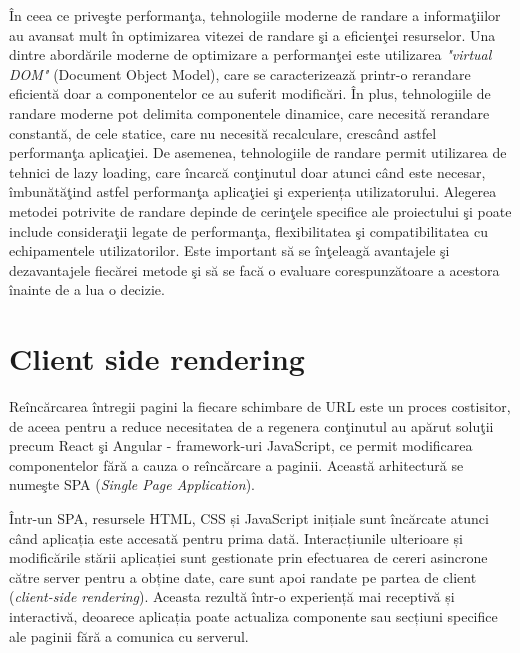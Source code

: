 \documentclass[12pt, a4paper]{report}
\begin{document}
\^ In ceea ce prive\c ste performan\c ta, tehnologiile moderne de randare a informa\c tiilor au avansat mult \^ in optimizarea vitezei de randare \c si a eficien\c tei resurselor. Una dintre abord\u arile moderne de optimizare a performan\c tei este utilizarea \emph{"virtual DOM"} (Document Object Model), care se caracterizează printr-o rerandare eficientă doar a componentelor ce au suferit modificări.
\^ In plus, tehnologiile de randare moderne pot delimita componentele dinamice, care necesită rerandare constantă, de cele statice, care nu necesit\u a recalculare, cresc\^ and astfel performan\c ta aplica\c tiei. De asemenea, tehnologiile de randare permit utilizarea de tehnici de lazy loading, care \^ incarc\u a con\c tinutul doar atunci c\^ and este necesar, \^ imbun\u at\u a\c tind astfel performan\c ta aplica\c tiei \c si experiența utilizatorului.
Alegerea metodei potrivite de randare depinde de cerin\c tele specifice ale proiectului \c si poate include considera\c tii legate de performan\c ta, flexibilitatea \c si compatibilitatea cu echipamentele utilizatorilor. Este important s\u a se \^ in\c teleag\u a avantajele \c si dezavantajele fiec\u arei metode \c si s\u a se fac\u a o evaluare corespunz\u atoare a acestora \^ inainte de a lua o decizie.


\section{Client side rendering}

Re\^ inc\u arcarea \^ intregii pagini la fiecare schimbare de URL este un proces costisitor, de aceea pentru a reduce necesitatea de a regenera con\c tinutul au ap\u arut solu\c tii precum React \c si Angular - framework-uri JavaScript, ce permit modificarea componentelor f\u ar\u a a cauza o re\^ inc\u arcare a paginii. Aceast\u a arhitectur\u a se nume\c ste SPA (\textit{Single Page Application}).

Într-un SPA, resursele HTML, CSS și JavaScript inițiale sunt încărcate atunci când aplicația este accesată pentru prima dată. Interacțiunile ulterioare și modificările stării aplicației sunt gestionate prin efectuarea de cereri asincrone către server pentru a obține date, care sunt apoi randate pe partea de client (\textit{client-side rendering}). Aceasta rezultă \^intr-o experiență mai receptivă și interactivă, deoarece aplicația poate actualiza componente sau secțiuni specifice ale paginii fără a comunica cu serverul.
\end{document}
